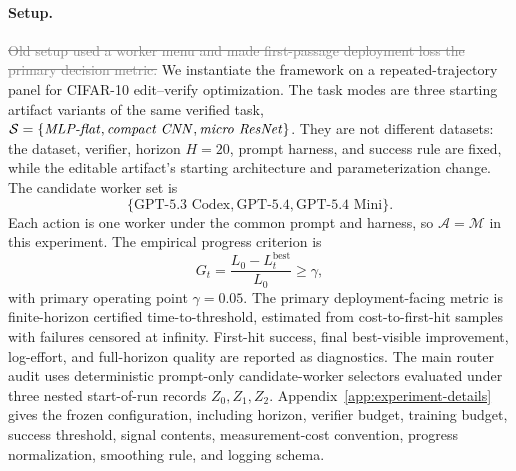 \documentclass{article}
\newcommand{\oldtext}[1]{\textcolor{gray}{\sout{#1}}}
\newcommand{\cA}{\mathcal{A}}
\newcommand{\cM}{\mathcal{M}}
\newcommand{\cS}{\mathcal{S}}
\begin{document}
\paragraph{Setup.}
\oldtext{Old setup used a worker menu and made first-passage deployment loss the primary decision metric.}
{\color{green!50!black}
We instantiate the framework on a repeated-trajectory panel for CIFAR-10 edit--verify optimization.
The task modes are three starting artifact variants of the same verified task, \(\cS=\{\text{\textit{MLP-flat}},\text{\textit{compact CNN}},\text{\textit{micro ResNet}}\}\).
They are not different datasets: the dataset, verifier, horizon \(H=20\), prompt harness, and success rule are fixed, while the editable artifact's starting architecture and parameterization change.
The candidate worker set is
\[
\{\text{GPT-5.3 Codex},\text{GPT-5.4},\text{GPT-5.4 Mini}\}.
\]
Each action is one worker under the common prompt and harness, so \(\cA=\cM\) in this experiment.
The empirical progress criterion is
\[
G_t=\frac{L_0-L_t^{\mathrm{best}}}{L_0}\ge\gamma,
\]
with primary operating point \(\gamma=0.05\).
The primary deployment-facing metric is finite-horizon certified time-to-threshold, estimated from cost-to-first-hit samples with failures censored at infinity.
First-hit success, final best-visible improvement, log-effort, and full-horizon quality are reported as diagnostics.
The main router audit uses deterministic prompt-only candidate-worker selectors evaluated under three nested start-of-run records \(Z_0,Z_1,Z_2\).
Appendix~\ref{app:experiment-details} gives the frozen configuration, including horizon, verifier budget, training budget, success threshold, signal contents, measurement-cost convention, progress normalization, smoothing rule, and logging schema.
}
\end{document}
